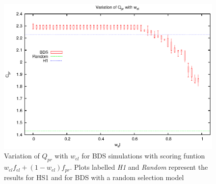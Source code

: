 \begin{figure}[htbp]
  \begin{center}
    \includegraphics[scale=1.0, angle=0]{figures/cmp_pr.eps}
  \end{center}
  \caption[Variation of $Q_{pr}$ with $w_{el}$ for BDS simulations.]
  {Variation of $Q_{pr}$ with $w_{el}$ for BDS simulations with scoring funtion $w_{el}f_{el}+(1-w_{el})f_{pr}$. Plots labelled \emph{H1} and \emph{Random} represent the results for HS1 and for BDS with a random selection model}
  \label{fig:bdsqpr}
\end{figure}
  
\clearpage


